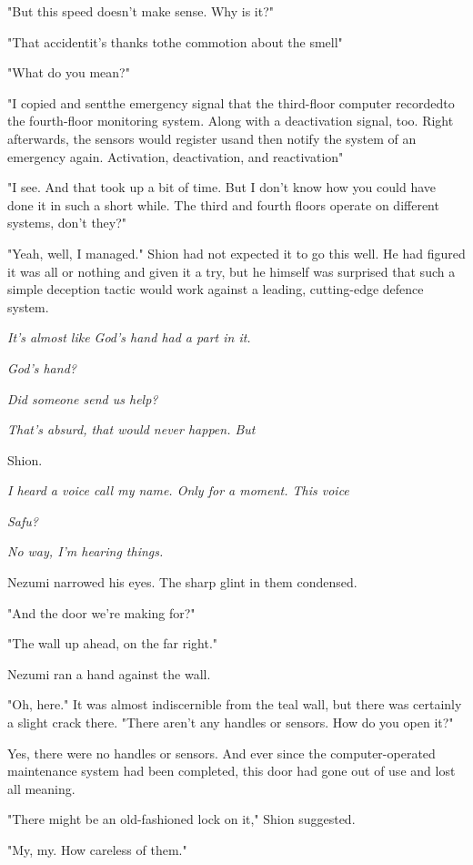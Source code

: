 "But this speed doesn't make sense. Why is it?"

"That accident\el it's thanks to\el the commotion about the smell\el "

"What do you mean?"

"I copied and sent\el the emergency signal that the third-floor computer
recorded\el to the fourth-floor monitoring system. Along with a
deactivation signal, too. Right afterwards, the sensors would register
us\el and then notify the system of an emergency again. Activation,
deactivation, and reactivation\el "

"I see. And that took up a bit of time. But I don't know how you could
have done it in such a short while. The third and fourth floors operate
on different systems, don't they?"

"\el Yeah, well, I managed." Shion had not expected it to go this well.
He had figured it was all or nothing and given it a try, but he himself
was surprised that such a simple deception tactic would work against a
leading, cutting-edge defence system.

\emph{It's almost like God's hand had a part in it.}

\emph{God's hand?}

\emph{Did someone send us help?}

\emph{That's absurd, that would never happen. But\el }

Shion.

\emph{I heard a voice call my name. Only for a moment. This voice\el }

\emph{Safu?}

\emph{No way, I'm hearing things.}

Nezumi narrowed his eyes. The sharp glint in them condensed.

"And the door we're making for?"

"The wall up ahead, on the far right."

Nezumi ran a hand against the wall.

"Oh, here." It was almost indiscernible from the teal wall, but there
was certainly a slight crack there. "There aren't any handles or
sensors. How do you open it?"

Yes, there were no handles or sensors. And ever since the
computer-operated maintenance system had been completed, this door had
gone out of use and lost all meaning.

"There might be an old-fashioned lock on it," Shion suggested.

"My, my. How careless of them."

